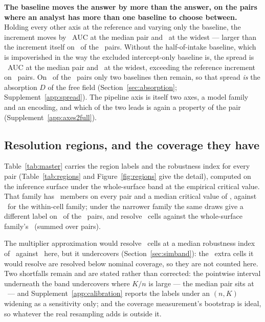 \textbf{The baseline moves the answer by more than the answer, on the pairs
where an analyst has more than one baseline to choose between.} Holding every
other axis at the reference and varying only the baseline, the increment
moves by \spreadMedian\ AUC at the median pair and \spreadMax\ at the widest
--- larger than the increment itself on \nSpreadExceedsIncrement\ of the
\nPairs\ pairs. Without the half-of-intake baseline, which is impoverished in
the way the excluded intercept-only baseline is, the spread is
\spreadRealisticMedian\ AUC at the median pair and \spreadRealisticMax\ at
the widest, exceeding the reference increment on \nSpreadExceedsRealistic\
pairs. On \nPairsTwoRealisticRungs\ of the \nPairs\ pairs only two baselines
then remain, so that spread \emph{is} the absorption $D$ of the free field
(Section~\ref{sec:absorption}; Supplement~\ref{app:spread}). The pipeline
axis is itself two axes, a model family and an encoding, and which of the two
leads is again a property of the pair (Supplement~\ref{app:axes2full}).

\subsection{Resolution regions, and the coverage they have}
\label{sec:regions}

Table~\ref{tab:master} carries the region labels and the robustness index
for every pair (Table~\ref{tab:regions} and Figure~\ref{fig:regions} give the
detail), computed on the inference surface under the whole-surface band at
the empirical critical value. That family has \familySizeMedian\
members on every pair and a median critical value of \maxTSurfaceMedian, against
\maxTWithinMedian\ for the within-cell family; under the narrower family the
same draws give a different label on \nRegionChangedByFamily\ of the
\nPairs\ pairs, and resolve \nResolvedWithin\ cells against the whole-surface
family's \nResolvedWhole\ (summed over pairs).

The multiplier approximation would resolve \nResolvedWholeMult\ cells at a
median robustness index of \rhoMedianMult\ against \rhoMedian\ here, but it
undercovers (Section~\ref{sec:simband}): the \nResolvedLostToEmp\ extra
cells it would resolve are resolved below nominal coverage, so they are not
counted here. Two shortfalls remain and are stated rather than corrected: the
pointwise interval underneath the band undercovers where $K/n$ is large ---
the median pair sits at \medianKoverN\ --- and Supplement~\ref{app:calibration}
reports the labels under an $(n, K)$ widening as a sensitivity only; and the
coverage measurement's bootstrap is ideal, so whatever the real resampling
adds is outside it.

